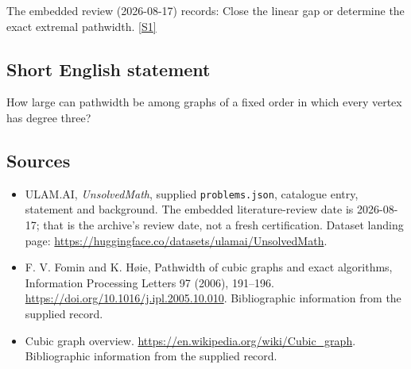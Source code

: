 \documentclass[11pt,a4paper]{article}
\newcommand{\sref}[2]{\hyperlink{source:#1:#2}{[S#2]}}
\begin{document}
The embedded review (2026-08-17) records: Close the linear gap or determine the exact extremal pathwidth. \sref{statement}{1}

\subsection{Short English statement}

How large can pathwidth be among graphs of a fixed order in which every vertex has degree three?

\subsection{Sources}

{\small

\begin{itemize}

\item[\hypertarget{source:statement:1}{S1}] ULAM.AI, \emph{UnsolvedMath}, supplied \texttt{problems.json}, catalogue entry, statement and background. The embedded literature-review date is 2026-08-17; that is the archive’s review date, not a fresh certification. Dataset landing page: \url{https://huggingface.co/datasets/ulamai/UnsolvedMath}.

\item[\hypertarget{source:statement:2}{S2}] F. V. Fomin and K. Høie, Pathwidth of cubic graphs and exact algorithms, Information Processing Letters 97 (2006), 191--196. \url{https://doi.org/10.1016/j.ipl.2005.10.010}. Bibliographic information from the supplied record.

\item[\hypertarget{source:statement:3}{S3}] Cubic graph overview. \url{https://en.wikipedia.org/wiki/Cubic_graph}. Bibliographic information from the supplied record.

\end{itemize}

}

\label{end:statement}
\end{document}
